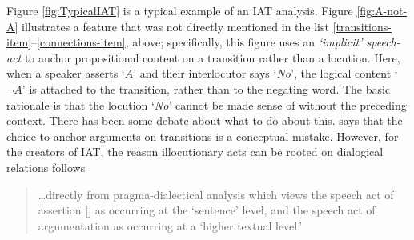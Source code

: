 \documentclass[smallextended,oneside]{svjour3}       %
\let\cite\citep
\begin{document}
Figure \ref{fig:TypicalIAT} is a typical example of an IAT analysis.
Figure \ref{fig:A-not-A} illustrates a feature
that was not directly mentioned in the list \ref{transitions-item}--\ref{connections-item}, above;
specifically,
this figure uses an \emph{{`}implicit{'} speech-act}
to anchor propositional content on a transition rather than a locution.
Here, when a speaker asserts `$A$' and their interlocutor says
`\emph{No}', the logical content `$\neg A$' is
attached to the transition, rather than to the negating word.
The basic rationale is that the locution `\emph{No}' cannot be made sense
of without the preceding context.  There has been some debate about what to do about this.
\citet{botting2015inferences} says that the choice to
anchor arguments on transitions is a conceptual mistake.  
However, for the creators of IAT, the reason illocutionary acts can
be rooted on dialogical relations follows
\begin{quote}
\ldots directly from pragma-dialectical analysis which views
the speech act of assertion [\lips] as occurring at the `sentence'
level, and the speech act of argumentation as occurring at a `higher
textual level.' \cite{budzynska2011speech}
\end{quote}
\end{document}
